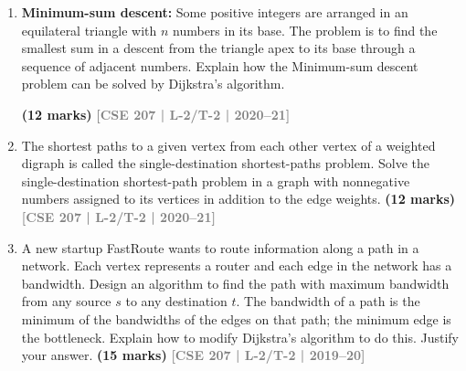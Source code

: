 \documentclass[12pt]{article}
\newcommand{\yr}[1]{\hfill\textcolor{gray}{\small\textbf{[#1]}}}
\newcommand{\mk}[1]{\textcolor{orange!70!black}{\small\textbf{(#1 marks)}}}
\begin{document}
\begin{enumerate}

  \item \textbf{Minimum-sum descent:} Some positive integers are arranged in an equilateral triangle with $n$ numbers in its base. The problem is to find the smallest sum in a descent from the triangle apex to its base through a sequence of adjacent numbers. Explain how the Minimum-sum descent problem can be solved by Dijkstra's algorithm.
    \begin{center}
    \end{center}

    \mk{12} \yr{CSE 207 | L-2/T-2 | 2020--21}


  \item The shortest paths to a given vertex from each other vertex of a weighted digraph is called the single-destination shortest-paths problem. Solve the single-destination shortest-path problem in a graph with nonnegative numbers assigned to its vertices in addition to the edge weights.
    \mk{12} \yr{CSE 207 | L-2/T-2 | 2020--21}


  \item A new startup FastRoute wants to route information along a path in a network. Each vertex represents a router and each edge in the network has a bandwidth. Design an algorithm to find the path with maximum bandwidth from any source $s$ to any destination $t$. The bandwidth of a path is the minimum of the bandwidths of the edges on that path; the minimum edge is the bottleneck. Explain how to modify Dijkstra's algorithm to do this. Justify your answer.
    \mk{15} \yr{CSE 207 | L-2/T-2 | 2019--20}


\end{enumerate}
\end{document}
